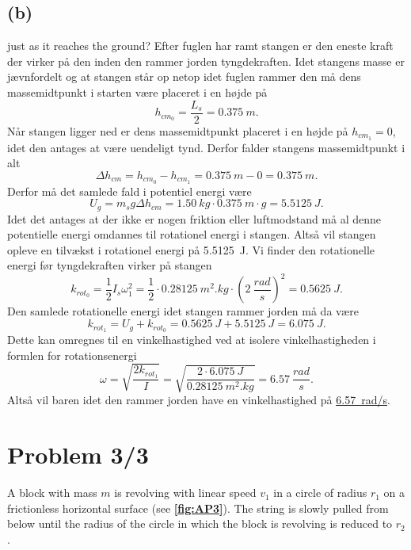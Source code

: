 \documentclass[12pt]{article}
\theoremstyle{definition}
\begin{document}
\subsection*{(b)}
just as it reaches the ground?
\bigbreak
Efter fuglen har ramt stangen er den eneste kraft der virker på den inden den rammer jorden tyngdekraften. Idet stangens masse er jævnfordelt og at stangen står op netop idet fuglen rammer den må dens massemidtpunkt i starten være placeret i en højde på
\[ 
h_{cm_0} = \frac{L_s}{2} = \qty{0,375}{m} 
.\]
Når stangen ligger ned er dens massemidtpunkt placeret i en højde på $h_{cm_1} = 0$, idet den antages at være uendeligt tynd. Derfor falder stangens massemidtpunkt i alt
\[ 
\Delta h_{cm} = h_{cm_0} - h_{cm_1} = \qty{0,375}{m} - 0 = \qty{0,375}{m}
.\]
Derfor må det samlede fald i potentiel energi være
\[ 
U_g = m_sg\Delta h_{cm} = \qty{1,50}{kg} \cdot \qty{0,375}{m}  \cdot g = \qty{5,5125}{J} 
.\]
Idet det antages at der ikke er nogen friktion eller luftmodstand må al denne potentielle energi omdannes til rotationel energi i stangen. Altså vil stangen opleve en tilvækst i rotationel energi på \qty{5,5125}{J}. Vi finder den rotationelle energi før tyngdekraften virker på stangen
\[ 
k_{rot_0} = \frac{1}{2}I_s\omega_1^2 = \frac{1}{2} \cdot \qty{0,28125}{m^2.kg} \cdot (\qty{2}{\frac{rad}{s}} )^2 = \qty{0,5625}{J} 
.\]
Den samlede rotationelle energi idet stangen rammer jorden må da være
\[ 
k_{rot_1} = U_g + k_{rot_0} = \qty{0,5625}{J} + \qty{5,5125}{J} = \qty{6,075}{J} 
.\]
Dette kan omregnes til en vinkelhastighed ved at isolere vinkelhastigheden i formlen for rotationsenergi
\[ 
  \omega = \sqrt{\frac{2k_{rot_1}}{I}} = \sqrt{\frac{2\cdot \qty{6,075}{J}}{\qty{0,28125}{m^2.kg}}} = \qty{6,57}{\frac{rad}{s}} 
.\]
Altså vil baren idet den rammer jorden have en vinkelhastighed på \underline{\underline{\qty{6,57}{rad/s}}}.





\section*{Problem 3/3}
A block with mass $m$ is revolving with linear speed $v_1$ in a circle of radius $r_1$ on a frictionless horizontal surface (see \textbf{\autoref{fig:AP3}}). The string is slowly pulled from below until the radius of the circle in which the block is revolving is reduced to $r_2$.
\end{document}
